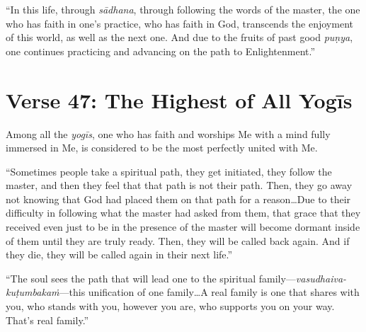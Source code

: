 \enquote{In this life, through \textit{sādhana}, through following the words of the master, the one who has faith in one’s practice, who has faith in God, transcends the enjoyment of this world, as well as the next one. And due to the fruits of past good \textit{puṇya}, one continues practicing and advancing on the path to Enlightenment.}

\section{Verse 47: The Highest of All Yogīs}\label{sec-verse-47-the-highest-of-all-yogis}
{Among all the \textit{yogīs}, one who has faith and worships Me with a mind fully immersed in Me, is considered to be the most perfectly united with Me.}

\enquote{Sometimes people take a spiritual path, they get initiated, they follow the master, and then they feel that that path is not their path. Then, they go away not knowing that God had placed them on that path for a reason\ldots Due to their difficulty in following what the master had asked from them, that grace that they received even just to be in the presence of the master will become dormant inside of them until they are truly ready. Then, they will be called back again. And if they die, they will be called again in their next life.}

\enquote{The soul sees the path that will lead one to the spiritual family---\textit{vasudhaiva-kuṭumbakaṁ}---this unification of one family\ldots A real family is one that shares with you, who stands with you, however you are, who supports you on your way. That’s real family.}
